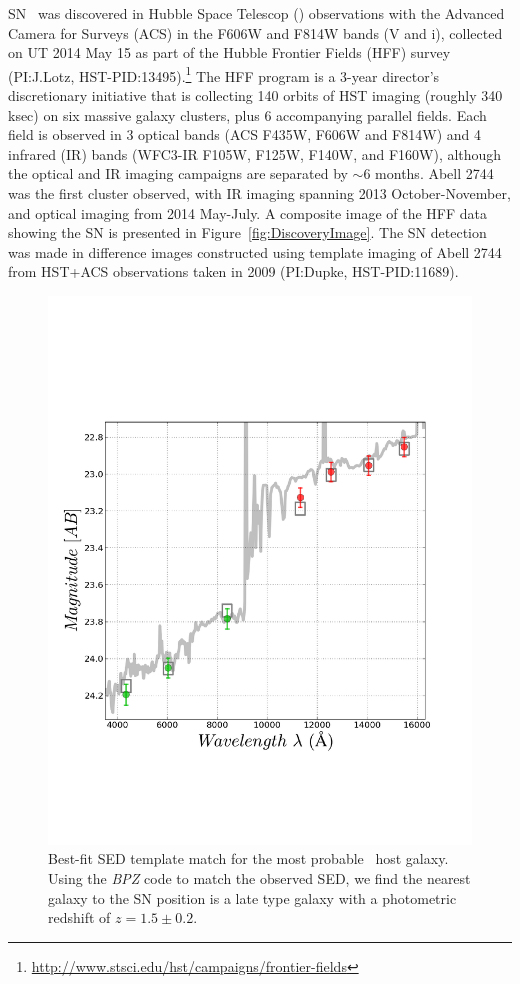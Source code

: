 SN \tomas\ was discovered in Hubble Space Telescop (\HST) observations
with the Advanced Camera for Surveys (ACS) in the F606W and F814W
bands (V and i), collected on UT 2014 May 15 as part of the Hubble
Frontier Fields (HFF) survey (PI:J.Lotz,
HST-PID:13495).\footnote{\url{http://www.stsci.edu/hst/campaigns/frontier-fields}}
The HFF program is a 3-year director's discretionary initiative that
is collecting 140 orbits of HST imaging (roughly 340 ksec) on six
massive galaxy clusters, plus 6 accompanying parallel fields.
Each field is observed in 3 optical bands (ACS F435W, F606W and F814W)
and 4 infrared (IR) bands (WFC3-IR F105W, F125W, F140W, and F160W),
although the optical and IR imaging campaigns are separated by $\sim$6
months. Abell 2744 was the first cluster observed, with IR imaging
spanning 2013 October-November, and optical imaging from 2014
May-July.  A composite image of the HFF data showing the SN is
presented in Figure~\ref{fig:DiscoveryImage}.  The SN detection was
made in difference images constructed using template imaging of Abell
2744 from HST+ACS observations taken in 2009 (PI:Dupke,
HST-PID:11689).



\begin{figure}
\begin{center}
\includegraphics[width=\columnwidth]{FIG/host_sed_fit}
\caption{  \label{fig:HostSED}
Best-fit SED template match for the most probable \tomas\ host
galaxy. Using the {\it BPZ} code to match the observed SED, we find
the nearest galaxy to the SN position is a late type galaxy with a
photometric redshift of $z=1.5\pm0.2$.}
\end{center}
\end{figure}

